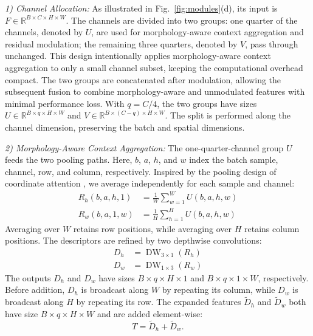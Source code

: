 \documentclass[journal]{IEEEtranTIE}
\begin{document}
\emph{1) Channel Allocation:}
 As illustrated in Fig.~\ref{fig:modules}(d), its input is $F\in\mathbb{R}^{B\times C\times H\times W}$. The channels are divided into two groups: one quarter of the channels, denoted by $U$, are used for morphology-aware context aggregation and residual modulation; the remaining three quarters, denoted by $V$, pass through unchanged. This design intentionally applies morphology-aware context aggregation to only a small channel subset, keeping the computational overhead compact. The two groups are concatenated after modulation, allowing the subsequent fusion to combine morphology-aware and unmodulated features with minimal performance loss. With $q=C/4$, the two groups have sizes $U\in\mathbb{R}^{B\times q\times H\times W}$ and $V\in\mathbb{R}^{B\times(C-q)\times H\times W}$. The split is performed along the channel dimension, preserving the batch and spatial dimensions.

\emph{2) Morphology-Aware Context Aggregation:}
The one-quarter-channel group $U$ feeds the two pooling paths. Here, $b$, $a$, $h$, and $w$ index the batch sample, channel, row, and column, respectively. Inspired by the pooling design of coordinate attention \cite{hou2021coordinate}, we average independently for each sample and channel:
\begin{align}
R_h(b,a,h,1) &= \frac{1}{W}\sum_{w=1}^{W}U(b,a,h,w) \label{eq:pac-row}\\
R_w(b,a,1,w) &= \frac{1}{H}\sum_{h=1}^{H}U(b,a,h,w) \label{eq:pac-column}
\end{align}
\noindent Averaging over $W$ retains row positions, while averaging over $H$ retains column positions. The descriptors are refined by two depthwise convolutions:
\begin{equation}
\begin{aligned}
D_h&=\operatorname{DW}_{3\times1}(R_h)\\
D_w&=\operatorname{DW}_{1\times3}(R_w)
\end{aligned}
\label{eq:pac-depthwise}
\end{equation}
\noindent The outputs $D_h$ and $D_w$ have sizes $B\times q\times H\times1$ and $B\times q\times1\times W$, respectively. Before addition, $D_h$ is broadcast along $W$ by repeating its column, while $D_w$ is broadcast along $H$ by repeating its row. The expanded features $\widetilde D_h$ and $\widetilde D_w$ both have size $B\times q\times H\times W$ and are added element-wise:
\begin{equation}
T=\widetilde D_h+\widetilde D_w.
\label{eq:pac-context}
\end{equation}
\end{document}
